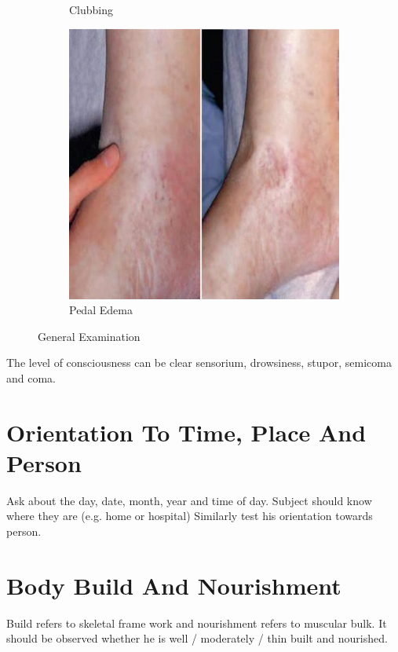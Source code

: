 \documentclass[a4paper,12pt]{book}
\begin{document}
{\begin{figure}[h]
\begin{subfigure}[t]{.23\textwidth}
																	\caption{Clubbing}
																	\label{Clubbing3}
																\end{subfigure}
																\hspace{\fill}
																\begin{subfigure}[t]{.23\textwidth}
																	\centering
																	\includegraphics[width=\textwidth]{./clinicalPhysioPic/pittingPedalEdema.jpg}
																	\caption{Pedal Edema}
																	\label{PedalEdema}
																\end{subfigure}
																\caption*{General Examination}
															\end{figure}
															}
															The level of consciousness can be clear sensorium, drowsiness, stupor, semicoma and coma.
															\section*{Orientation To Time, Place And Person}
															Ask about the day, date, month, year and time of day. Subject should know where they are (e.g. home or hospital) Similarly test his orientation towards person.
															\section*{Body Build And Nourishment}
															Build refers to skeletal frame work and nourishment refers to muscular bulk. It should be observed whether he is well / moderately / thin built and nourished.
\end{document}
